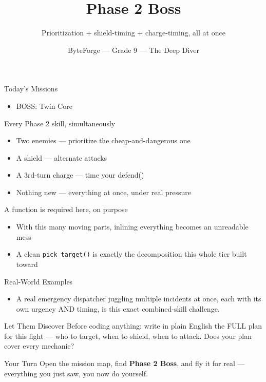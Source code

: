 \documentclass[aspectratio=169]{beamer}
\title{Phase 2 Boss}
\subtitle{Prioritization + shield-timing + charge-timing, all at once}
\author{ByteForge --- Grade 9 --- The Deep Diver}
\date{}
\begin{document}
\begin{frame}
    \titlepage
\end{frame}

\begin{frame}{Today's Missions}
    \Large
    \begin{itemize}
        \item BOSS: Twin Core
    \end{itemize}
\end{frame}

\begin{frame}{Every Phase 2 skill, simultaneously}
    \large
    \begin{itemize}
        \item Two enemies --- prioritize the cheap-and-dangerous one
        \item A shield --- alternate attacks
        \item A 3rd-turn charge --- time your defend()
        \item Nothing new --- everything at once, under real pressure
    \end{itemize}
\end{frame}


\begin{frame}{A function is required here, on purpose}
    \large
    \begin{itemize}
        \item With this many moving parts, inlining everything becomes an unreadable mess
        \item A clean \texttt{pick\_target()} is exactly the decomposition this whole tier built toward
    \end{itemize}
\end{frame}

\begin{frame}{Real-World Examples}
    \large
    \begin{itemize}
        \item A real emergency dispatcher juggling multiple incidents at once, each with its own urgency AND timing, is this exact combined-skill challenge.
    \end{itemize}
\end{frame}


\begin{frame}{Let Them Discover}
    \large
    Before coding anything: write in plain English the FULL plan for this fight --- who to target, when to shield, when to attack. Does your plan cover every mechanic?
\end{frame}

\begin{frame}{Your Turn}
    \Large
    Open the mission map, find \textbf{Phase 2 Boss}, and fly it for real ---
    everything you just saw, you now do yourself.
\end{frame}
\end{document}
